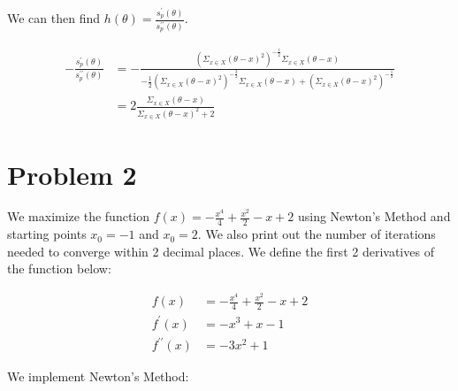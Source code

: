 \documentclass[]{article}
\begin{document}
We can then find
\(h(\theta) = \frac{s_p^{\prime}(\theta)}{s_p^{\prime \prime}(\theta)}\).

\begin{align*}
  -\frac{s_p^{\prime}(\theta)}{s_p^{\prime \prime}(\theta)} &=
    -\frac{(\Sigma_{x \in X} (\theta - x)^{2})^{-\frac{1}{2}}\Sigma_{x\in X}(\theta - x)}
      {-\frac{1}{2} (\Sigma_{x \in X} (\theta - x)^2)^{-\frac{3}{2}}
      \Sigma_{x \in X}(\theta - x) +  (\Sigma_{x \in X} (\theta - x)^2)^{-\frac{1}{2}}} \\
      &= 2 \frac{\Sigma_{x \in X}(\theta - x)}{\Sigma_{x \in X}(\theta - x)^2 + 2}
\end{align*}

\section{Problem 2}\label{problem-2}

We maximize the function
\(f(x) = -\frac{x^4}{4} + \frac{x^2}{2} - x + 2\) using Newton's Method
and starting points \(x_0=-1\) and \(x_0=2\). We also print out the
number of iterations needed to converge within 2 decimal places. We
define the first 2 derivatives of the function below:

\begin{align}
f(x) &= -\frac{x^4}{4} + \frac{x^2}{2} - x + 2 \\ 
f^{\prime}(x) &= -x^3+ x - 1 \\ 
f^{\prime \prime}(x) &= -3x^2 + 1
\end{align}

We implement Newton's Method:
\end{document}
